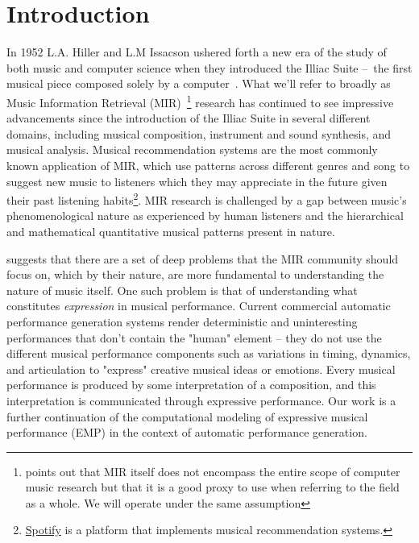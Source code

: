 \chapter{Introduction} \label{ch:ch1}

In 1952 L.A. Hiller and L.M Issacson ushered forth a new era of the study of both music and computer science when they introduced the Illiac Suite – the first musical piece composed solely by a computer~\cite{sandred2009revisiting}. What we'll refer to broadly as Music Information Retrieval (MIR)~\footnote{\citet{widmer2016getting} points out that MIR itself does not encompass the entire scope of computer music research but that it is a good proxy to use when referring to the field as a whole. We will operate under the same assumption} research has continued to see impressive advancements since the introduction of the Illiac Suite in several different domains, including musical composition\cite{briot2017deep}, instrument and sound synthesis\cite{engel2017neural}, and musical analysis\cite{widmer2016getting}. Musical recommendation systems are the most commonly known application of MIR, which use patterns across different genres and song to suggest new music to listeners which they may appreciate in the future given their past listening habits\footnote{\href{https://www.spotify.com/us/}{Spotify}     is a platform that implements musical recommendation systems.}. MIR research is challenged by a gap between music's phenomenological nature as experienced by human listeners and the hierarchical and mathematical quantitative musical patterns present in nature.

\citet{widmer2016getting} suggests that there are a set of deep problems that the MIR community should focus on, which by their nature, are more fundamental to understanding the nature of music itself. One such problem is that of understanding what constitutes \emph{expression} in musical performance. Current commercial automatic performance generation systems render deterministic and uninteresting performances that don't contain the "human" element -- they do not use the different musical performance components such as variations in timing, dynamics, and articulation to "express" creative musical ideas or emotions. Every musical performance is produced by some interpretation of a composition, and this interpretation is communicated through expressive performance. Our work is a further continuation of the computational modeling of expressive musical performance (EMP) in the context of automatic performance generation. 

